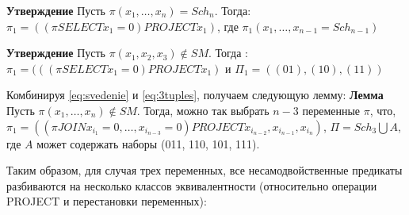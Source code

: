 \documentclass[12pt]{article}
\begin{document}
\label{eq:svedenie}
\textbf{Утверждение} Пусть $\pi(x_1, \dots, x_n) = Sch_n$. 
Тогда: $\pi_1 = ((\pi SELECT x_1=0) PROJECT x_1)$, где $\pi_1(x_1, \dots, x_{n-1} = Sch_{n-1})$

\label{eq:3tuples}
\textbf{Утверждение} Пусть $\pi(x_1, x_2, x_3) \notin SM$. 
Тогда : $\pi_1 = (((\pi SELECT x_1=0) PROJECT x_1)$ и $\Pi_1 = ((01), (10), (11))$

Комбинируя \ref{eq:svedenie} и \ref{eq:3tuples}, получаем следующую лемму:
\label{eq:main_lemma}
\textbf{Лемма} Пусть $\pi(x_1, \dots, x_n) \notin SM$. Тогда, можно так выбрать $n-3$ переменные $\pi$, что,
$\pi_1 = ((\pi JOIN x_{i_1}=0, \dots, x_{i_{n-3}}=0) PROJECT x_{i_{n-2}}, x_{i_{n-1}}, x_{i_n})$, $\Pi = Sch_3 \bigcup A$, 
где $A$ может содержать наборы (011, 110, 101, 111).

Таким образом, для случая трех переменных, все несамодвойственные предикаты разбиваются на несколько классов эквивалентности 
(относительно операции PROJECT и перестановки переменных): 
\end{document}
